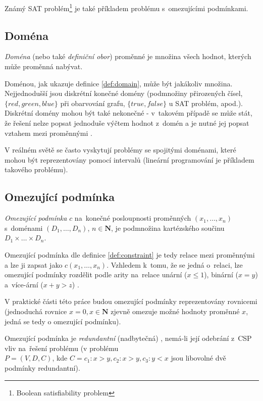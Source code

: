 Známý SAT problém\footnote{Boolean satisfiability problem} je také příkladem problému s~omezujícími podmínkami.

\subsection{Doména}
\begin{definition}[{\cite[s.~10]{Vu2005}}]
\label{def:domain}
\emph{Doména} (nebo také \emph{definiční obor}) proměnné je množina všech hodnot, kterých může proměnná nabývat.
\end{definition}

Doménou, jak ukazuje definice \ref{def:domain}, může být jakákoliv množina. Nejjednodušší jsou diskrétní konečné domény (podmnožiny přirozených čísel,\\ $\{red, green, blue \}$ při obarvování grafu, $\{ true, false \}$ u SAT problém, apod.). Diskrétní domény mohou být také nekonečné - v~takovém případě se může stát, že řešení nelze popsat jednoduše výčtem hodnot z~domén a je nutné jej popsat vztahem mezi proměnnými \cite[s.~139]{Russell:2003}.

V reálném světě se často vyskytují problémy se spojitými doménami, které mohou být reprezentovány pomocí intervalů (lineární programování je příkladem takového problému).


\subsection{Omezující podmínka}
\begin{definition}[{\cite[s.~11]{Vu2005}}]
\label{def:constraint}
\emph{Omezující podmínka} $c$ na~konečné posloupnosti proměnných $(x_1, \dots, x_n)$ s~doménami $(D_1, \dots, D_n)$, $n \in \boldsymbol{N}$, je podmnožina kartézského součinu $ D_1 \times \dots \times D_n $.
\end{definition}

Omezující podmínka dle definice \ref{def:constraint} je tedy relace mezi proměnnými a lze ji zapsat jako $c(x_1, \dots, x_n)$. Vzhledem k~tomu, že se jedná o~relaci, lze omezující podmínky rozdělit podle arity na~relace unární ($x \leq 1$), binární ($x = y$) a~více-ární ($x + y > z $) \cite[s.~139]{Russell:2003}.

V praktické části této práce budou omezující podmínky reprezentovány rovnicemi (jednoduchá rovnice $x = 0, x \in \boldsymbol{N}$ zjevně omezuje možné hodnoty proměnné $x$, jedná se tedy o omezující podmínku).

Omezující podmínka je \emph{redundantní} (nadbytečná) {\cite[s.~20]{Vu2005}}, nemá-li její odebrání z~CSP vliv na~řešení problému (v problému \\ $P = (V, D, C)$, kde $C = {c_1: x > y, c_2: x > y, c_3: y < x}$ jsou libovolné dvě podmínky redundantní).


